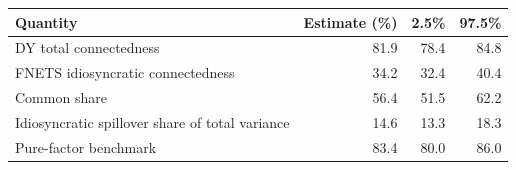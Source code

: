 \begin{tabular}{lrrr}
\toprule
Quantity & Estimate (\%) & 2.5\% & 97.5\% \\
\midrule
DY total connectedness & 81.9 & 78.4 & 84.8 \\
FNETS idiosyncratic connectedness & 34.2 & 32.4 & 40.4 \\
Common share & 56.4 & 51.5 & 62.2 \\
Idiosyncratic spillover share of total variance & 14.6 & 13.3 & 18.3 \\
Pure-factor benchmark & 83.4 & 80.0 & 86.0 \\
\bottomrule
\end{tabular}
